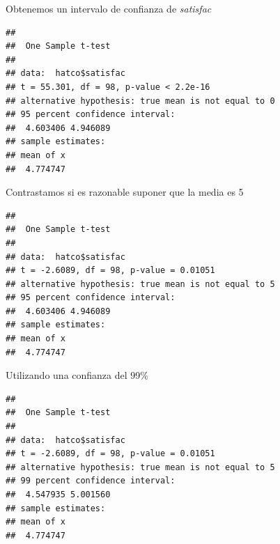 \documentclass[
]{book}
\newenvironment{Shaded}{\begin{snugshade}}{\end{snugshade}}
\newcommand{\AttributeTok}[1]{\textcolor[rgb]{0.77,0.63,0.00}{#1}}
\newcommand{\CommentTok}[1]{\textcolor[rgb]{0.56,0.35,0.01}{\textit{#1}}}
\newcommand{\DecValTok}[1]{\textcolor[rgb]{0.00,0.00,0.81}{#1}}
\newcommand{\FloatTok}[1]{\textcolor[rgb]{0.00,0.00,0.81}{#1}}
\newcommand{\FunctionTok}[1]{\textcolor[rgb]{0.00,0.00,0.00}{#1}}
\newcommand{\NormalTok}[1]{#1}
\newcommand{\SpecialCharTok}[1]{\textcolor[rgb]{0.00,0.00,0.00}{#1}}
\theoremstyle{break}
\begin{document}
Obtenemos un intervalo de confianza de \emph{satisfac}

\begin{Shaded}
\end{Shaded}

\begin{verbatim}
## 
##  One Sample t-test
## 
## data:  hatco$satisfac
## t = 55.301, df = 98, p-value < 2.2e-16
## alternative hypothesis: true mean is not equal to 0
## 95 percent confidence interval:
##  4.603406 4.946089
## sample estimates:
## mean of x 
##  4.774747
\end{verbatim}

Contrastamos si es razonable suponer que la media es 5

\begin{Shaded}
\end{Shaded}

\begin{verbatim}
## 
##  One Sample t-test
## 
## data:  hatco$satisfac
## t = -2.6089, df = 98, p-value = 0.01051
## alternative hypothesis: true mean is not equal to 5
## 95 percent confidence interval:
##  4.603406 4.946089
## sample estimates:
## mean of x 
##  4.774747
\end{verbatim}

Utilizando una confianza del 99\%

\begin{Shaded}
\end{Shaded}

\begin{verbatim}
## 
##  One Sample t-test
## 
## data:  hatco$satisfac
## t = -2.6089, df = 98, p-value = 0.01051
## alternative hypothesis: true mean is not equal to 5
## 99 percent confidence interval:
##  4.547935 5.001560
## sample estimates:
## mean of x 
##  4.774747
\end{verbatim}
\end{document}
